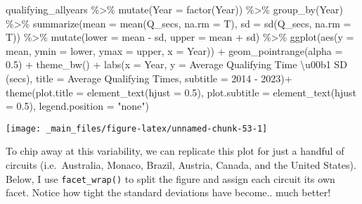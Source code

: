 \documentclass[
]{book}
\newenvironment{Shaded}{\begin{snugshade}}{\end{snugshade}}
\newcommand{\AttributeTok}[1]{\textcolor[rgb]{0.77,0.63,0.00}{#1}}
\newcommand{\FloatTok}[1]{\textcolor[rgb]{0.00,0.00,0.81}{#1}}
\newcommand{\FunctionTok}[1]{\textcolor[rgb]{0.00,0.00,0.00}{#1}}
\newcommand{\NormalTok}[1]{#1}
\newcommand{\SpecialCharTok}[1]{\textcolor[rgb]{0.00,0.00,0.00}{#1}}
\newcommand{\StringTok}[1]{\textcolor[rgb]{0.31,0.60,0.02}{#1}}
\begin{document}
\begin{Shaded}
\begin{Highlighting}[]
\NormalTok{qualifying\_allyears }\SpecialCharTok{\%\textgreater{}\%}
  \FunctionTok{mutate}\NormalTok{(}\AttributeTok{Year =} \FunctionTok{factor}\NormalTok{(Year)) }\SpecialCharTok{\%\textgreater{}\%}
  \FunctionTok{group\_by}\NormalTok{(Year) }\SpecialCharTok{\%\textgreater{}\%}
  \FunctionTok{summarize}\NormalTok{(}\AttributeTok{mean =} \FunctionTok{mean}\NormalTok{(Q\_secs, }\AttributeTok{na.rm =}\NormalTok{ T),}
            \AttributeTok{sd =} \FunctionTok{sd}\NormalTok{(Q\_secs, }\AttributeTok{na.rm =}\NormalTok{ T)) }\SpecialCharTok{\%\textgreater{}\%} 
  \FunctionTok{mutate}\NormalTok{(}\AttributeTok{lower =}\NormalTok{ mean  }\SpecialCharTok{{-}}\NormalTok{ sd,}
         \AttributeTok{upper =}\NormalTok{ mean }\SpecialCharTok{+}\NormalTok{ sd) }\SpecialCharTok{\%\textgreater{}\%}
  \FunctionTok{ggplot}\NormalTok{(}\FunctionTok{aes}\NormalTok{(}\AttributeTok{y =}\NormalTok{ mean, }\AttributeTok{ymin =}\NormalTok{ lower, }\AttributeTok{ymax =}\NormalTok{ upper, }\AttributeTok{x =}\NormalTok{ Year)) }\SpecialCharTok{+}
  \FunctionTok{geom\_pointrange}\NormalTok{(}\AttributeTok{alpha =} \FloatTok{0.5}\NormalTok{) }\SpecialCharTok{+}
  \FunctionTok{theme\_bw}\NormalTok{() }\SpecialCharTok{+}
  \FunctionTok{labs}\NormalTok{(}\AttributeTok{x =} \StringTok{\textquotesingle{}Year\textquotesingle{}}\NormalTok{,}
       \AttributeTok{y =} \StringTok{\textquotesingle{}Average Qualifying Time \textbackslash{}u00b1 SD (secs)\textquotesingle{}}\NormalTok{,}
       \AttributeTok{title =} \StringTok{\textquotesingle{}Average Qualifying Times\textquotesingle{}}\NormalTok{,}
       \AttributeTok{subtitle =} \StringTok{\textquotesingle{}2014 {-} 2023\textquotesingle{}}\NormalTok{)}\SpecialCharTok{+}
  \FunctionTok{theme}\NormalTok{(}\AttributeTok{plot.title =} \FunctionTok{element\_text}\NormalTok{(}\AttributeTok{hjust =} \FloatTok{0.5}\NormalTok{),}
        \AttributeTok{plot.subtitle =} \FunctionTok{element\_text}\NormalTok{(}\AttributeTok{hjust =} \FloatTok{0.5}\NormalTok{),}
        \AttributeTok{legend.position =} \StringTok{"none"}\NormalTok{)}
\end{Highlighting}
\end{Shaded}

\begin{center}\texttt{[image: \_main\_files/figure-latex/unnamed-chunk-53-1]} \end{center}

To chip away at this variability, we can replicate this plot for just a handful of circuits (i.e.~Australia, Monaco, Brazil, Austria, Canada, and the United States). Below, I use \texttt{facet\_wrap()} to split the figure and assign each circuit its own facet. Notice how tight the standard deviations have become.. much better!
\end{document}
